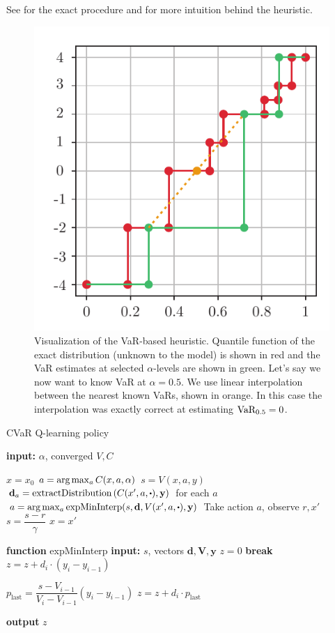 See  for the exact procedure and  for more intuition behind the heuristic.

\begin{figure}[h]
\center
\includegraphics[width=0.5\linewidth]{gfx/heuristic.pdf}
\caption[The VaR-based heuristic.]{Visualization of the VaR-based heuristic. Quantile function of the exact distribution (unknown to the model) is shown in red and the VaR estimates at selected $\alpha$-levels are shown in green. Let's say we now want to know VaR at $\alpha=0.5$. We use linear interpolation between the nearest known VaRs, shown in orange. In this case the interpolation was exactly correct at estimating $\text{VaR}_{0.5}=0$.}
\label{fig:heuristic}
\end{figure}


\begin{algorithm}
\caption{CVaR Q-learning policy}\label{alg:varbasedpolicy}
\begin{algorithmic}
    \STATE \textbf{input:} $\alpha$, converged $V, C$
    		
	\STATE $x = x_0$
	\STATE $a = \text{arg}\max_a C(x, a, \alpha)$
	\STATE $s = V(x, a, y)$
	\STATE $\mathbf{d}_a = \text{extractDistribution}\bround{C(x', a, \bigcdot), \mathbf{y}}$ for each $a$
	\STATE $a = \argmax_a \text{expMinInterp}(s, \mathbf{d}, V(x', a, \bigcdot), \mathbf{y})$
	\STATE Take action $a$, observe $r, x'$
	\STATE $s = \dfrac{s-r}{\gamma}$
	\STATE $x = x'$
	\ENDWHILE

\hrulefill

	\STATE {}
	\STATE \textbf{function} expMinInterp  
\bindent
    \STATE \textbf{input:} $s$, vectors $\mathbf{d}, \mathbf{V}, \mathbf{y}$
    \STATE $z = 0$
		\STATE \textbf{break}
		\ENDIF
		\STATE $z = z + d_i\cdot(y_i - y_{i-1})$
	\ENDFOR
	
	\STATE $p_{\text{last}} = \dfrac{s - V_{i-1}}{V_{i}-V_{i-1}}(y_i - y_{i-1})$
	\STATE $z = z + d_i \cdot p_{\text{last}}$
	
	\STATE \textbf{output} $z$
\eindent
\end{algorithmic}
\end{algorithm}


